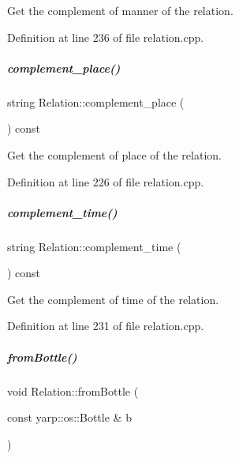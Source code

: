 Get the complement of manner of the relation. 



Definition at line 236 of file relation.\+cpp.

\mbox{\label{group__icubclient__representations_a8a4d20108d73ff505c8cadfaeb902c98}} 
\subparagraph{\texorpdfstring{complement\+\_\+place()}{complement\_place()}}
{\footnotesize\ttfamily string Relation\+::complement\+\_\+place (\begin{DoxyParamCaption}{ }\end{DoxyParamCaption}) const}



Get the complement of place of the relation. 



Definition at line 226 of file relation.\+cpp.

\mbox{\label{group__icubclient__representations_a2aa21779ce00775fc5a937e9cfc9bce0}} 
\subparagraph{\texorpdfstring{complement\+\_\+time()}{complement\_time()}}
{\footnotesize\ttfamily string Relation\+::complement\+\_\+time (\begin{DoxyParamCaption}{ }\end{DoxyParamCaption}) const}



Get the complement of time of the relation. 



Definition at line 231 of file relation.\+cpp.

\mbox{\label{group__icubclient__representations_aacd17ed756214b7cab4baf9708257340}} 
\subparagraph{\texorpdfstring{from\+Bottle()}{fromBottle()}}
{\footnotesize\ttfamily void Relation\+::from\+Bottle (\begin{DoxyParamCaption}\item[{const yarp\+::os\+::\+Bottle \&}]{b }\end{DoxyParamCaption})}



